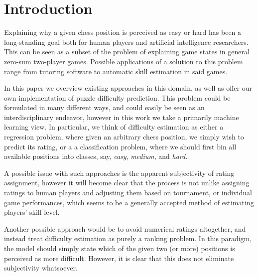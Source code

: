 \documentclass[sigconf,nonacm]{acmart}
\begin{document}

\maketitle

\section{Introduction}

Explaining why a given chess position is perceived as easy or hard has been a long-standing goal both for human players and artificial intelligence researchers. This can be seen as a subset of the problem of explaining game states in general zero-sum two-player games. Possible applications of a solution to this problem range from tutoring software to automatic skill estimation in said games.

In this paper we overview existing approaches in this domain, as well as offer our own implementation of puzzle difficulty prediction. This problem could be formulated in many different ways, and could easily be seen as an interdisciplinary endeavor, however in this work we take a primarily machine learning view. In particular, we think of difficulty estimation as either a regression problem, where given an arbitrary chess position, we simply wish to predict its rating, or a a classification problem, where we should first bin all available positions into classes, say, \textit{easy}, \textit{medium}, and \textit{hard}. 

A possible issue with such approaches is the apparent subjectivity of rating assignment, however it will become clear that the process is not unlike assigning ratings to human players and adjusting them based on tournament, or individual game performances, which seems to be a generally accepted method of estimating players' skill level. 

Another possible approach would be to avoid numerical ratings altogether, and instead treat difficulty estimation as purely a ranking problem. In this paradigm, the model should simply state which of the given two (or more) positions is perceived as more difficult. However, it is clear that this does not eliminate subjectivity whatsoever. 
\end{document}

